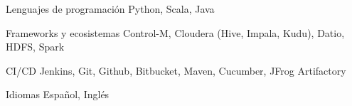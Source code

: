 

\begin{cvskills}

  \cvskill
    {Lenguajes de programación} %
    {Python, Scala, Java} %

  \cvskill
    {Frameworks y ecosistemas} %
    {Control-M, Cloudera (Hive, Impala, Kudu), Datio, HDFS, Spark} %

  \cvskill
    {CI/CD} %
    {Jenkins, Git, Github, Bitbucket, Maven, Cucumber, JFrog Artifactory} %

  \cvskill
    {Idiomas} %
    {Español, Inglés} %

\end{cvskills}

